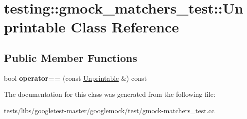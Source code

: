 \hypertarget{classtesting_1_1gmock__matchers__test_1_1Unprintable}{}\section{testing\+:\+:gmock\+\_\+matchers\+\_\+test\+:\+:Unprintable Class Reference}
\label{classtesting_1_1gmock__matchers__test_1_1Unprintable}
\subsection*{Public Member Functions}
\begin{DoxyCompactItemize}
\item 
\mbox{\label{classtesting_1_1gmock__matchers__test_1_1Unprintable_ae09dc235a5341b07f0299bd24ee37e2d}} 
bool {\bfseries operator==} (const \hyperlink{classtesting_1_1gmock__matchers__test_1_1Unprintable}{Unprintable} \&) const
\end{DoxyCompactItemize}


The documentation for this class was generated from the following file\+:\begin{DoxyCompactItemize}
\item 
tests/libs/googletest-\/master/googlemock/test/gmock-\/matchers\+\_\+test.\+cc\end{DoxyCompactItemize}
